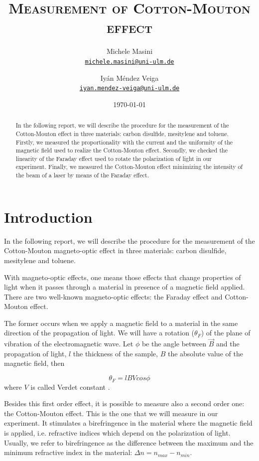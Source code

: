 \documentclass[11pt,a4paper]{article}
\title{\bfseries\textsc{Measurement of Cotton-Mouton effect}}
\author{
Michele Masini\\ \small\texttt{\href{mailto:michele.masini@uni-ulm.de}{michele.masini@uni-ulm.de}}\and
Iyán Méndez Veiga\\ \small\texttt{\href{mailto:iyan.mendez-veiga@uni-ulm.de}{iyan.mendez-veiga@uni-ulm.de}}
}
\date{\today}
\begin{document}
\maketitle

\begin{abstract}
In the following report, we will describe the procedure for the measurement of the Cotton-Mouton effect in three materials: carbon disulfide, mesitylene and toluene. Firstly, we measured the proportionality with the current and the uniformity of the magnetic field used to realize the Cotton-Mouton effect. Secondly, we checked the linearity of the Faraday effect used to rotate the polarization of light in our experiment. Finally, we measured the Cotton-Mouton effect minimizing the intensity of the beam of a laser by means of the Faraday effect.
\end{abstract}

\vspace{1.5cm}

\section{Introduction}

\vspace{.5cm}
In the following report, we will describe the procedure for the measurement of the Cotton-Mouton magneto-optic effect in three materials: carbon disulfide, mesitylene and toluene.

With magneto-optic effects, one means those effects that change properties of light when it passes through a material in presence of a magnetic field applied.	There are two well-known magneto-optic effects: the Faraday effect and Cotton-Mouton effect.
	
The former occurs when we apply a magnetic field to a material in the same direction of the propagation of light. We will have a rotation ($\theta_F$) of the plane of vibration of the electromagnetic wave. Let $\phi$ be the angle between $\vec{B}$ and the propagation of light, $l$ the thickness of the sample, $B$ the absolute value of the magnetic field, then

\begin{equation}
\theta_F=lBVcos\phi\label{verd}
\end{equation}
where $V$ is called Verdet constant \cite{cappelli2003cotton}. 

Besides this first order effect, it is possible to measure also a second order one: the Cotton-Mouton effect. This is the one that we will measure in our experiment. It stimulates a birefringence in the material where the magnetic field is applied, i.e. refractive indices which depend on the polarization of light. Usually, we refer to birefringence as the difference between the maximum and the minimum refractive index in the material: $\Delta n=n_{max}-n_{min}$.
\end{document}
